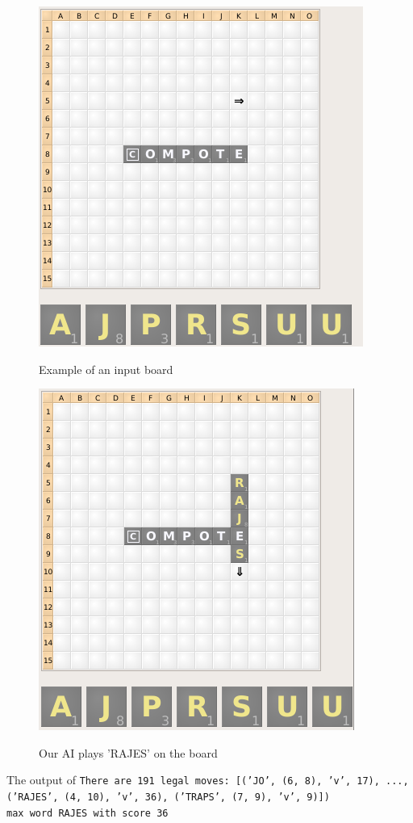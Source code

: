 \documentclass[12pt]{article}
\begin{document}
\begin{figure}[h]
    \centering
  \includegraphics[scale=0.4]{exampleboard}
  \caption{Example of an input board}
  \endminipage
      \centering
  \includegraphics[scale=0.4]{exampleplay}\\
   \caption{Our AI plays 'RAJES' on the board}
  \endminipage{}
\end{figure}

The output of
\texttt{There are 191 legal moves: [('JO', (6, 8), 'v', 17), ...,  ('RAJES', (4, 10), 'v', 36), ('TRAPS', (7, 9), 'v', 9)])\\
max word RAJES with score 36}
\end{document}

